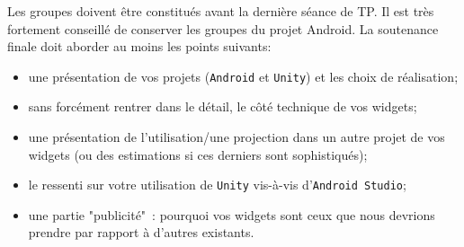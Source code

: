 \documentclass[a4paper,10pt]{article}
\begin{document}
Les groupes doivent être constitués avant la dernière séance de TP. Il est très fortement conseillé de conserver les groupes du projet Android. La soutenance finale doit aborder au moins les points suivants:
\begin{itemize}
	\item une présentation de vos projets (\texttt{Android} et \texttt{Unity}) et les choix de réalisation;
	\item sans forcément rentrer dans le détail, le côté technique  de vos widgets;
	\item une présentation de l'utilisation/une projection dans un autre projet  de vos widgets (ou des estimations si ces derniers sont sophistiqués);
	\item le ressenti sur votre utilisation de \texttt{Unity} vis-à-vis d'\texttt{Android Studio};
	\item une partie "publicité"~: pourquoi vos widgets sont ceux que nous devrions prendre par rapport à d'autres existants.
\end{itemize}
\end{document}
